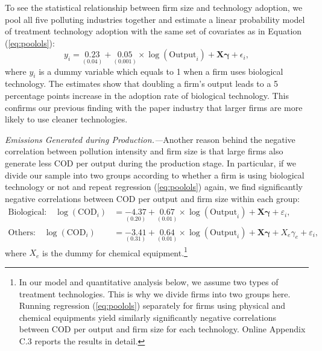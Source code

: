 \documentclass[AEJ]{AEA}
\renewcommand{\vec}[1]{\ensuremath{\mathbf{#1}}}
\begin{document}
To see the statistical relationship between firm size and technology adoption, we pool all five polluting industries together and estimate a linear probability model of treatment technology adoption with the same set of covariates as in Equation (\ref{eq:poolols}):
\begin{equation*}
    y_i = \underset{(0.04)}{0.23} + \underset{(0.001)}{0.05} \times \log (\text{Output}_i) + \vec{X} \vec{\gamma} + \epsilon_i,
\end{equation*}
where $y_i$ is a dummy variable which equals to 1 when a firm uses biological technology. The estimates show that doubling a firm's output leads to a 5 percentage points increase in the adoption rate of biological technology. This confirms our previous finding with the paper industry that larger firms are more likely to use cleaner technologies.

\textit{Emissions Generated during Production.---}Another reason behind the negative correlation between pollution intensity and firm size is that large firms also generate less COD per output during the production stage. In particular, if we divide our sample into two groups according to whether a firm is using biological technology or not and repeat regression (\ref{eq:poolols}) again, we find significantly negative correlations between COD per output and firm size within each group:
\begin{align}
\label{eq:poolols_biological}
    \text{Biological:} \quad \log (\text{COD}_i) &= \underset{(0.20)}{-4.37} + \underset{(0.01)}{0.67} \times \log (\text{Output}_i) + \vec{X} \vec{\gamma} + \varepsilon_i, \\
\label{eq:poolols_others}
    \text{Others:} \quad \log (\text{COD}_i) &= \underset{(0.31)}{-3.41} + \underset{(0.01)}{0.64} \times \log (\text{Output}_i) + \vec{X} \vec{\gamma} + X_e \gamma_e + \varepsilon_i,
\end{align}
where $X_e$ is the dummy for chemical equipment.\footnote{In our model and quantitative analysis below, we assume two types of treatment technologies. This is why we divide firms into two groups here. Running regression (\ref{eq:poolols}) separately for firms using physical and chemical equipments yield similarly significantly negative correlations between COD per output and firm size for each technology. Online Appendix C.3 reports the results in detail.}
\end{document}
